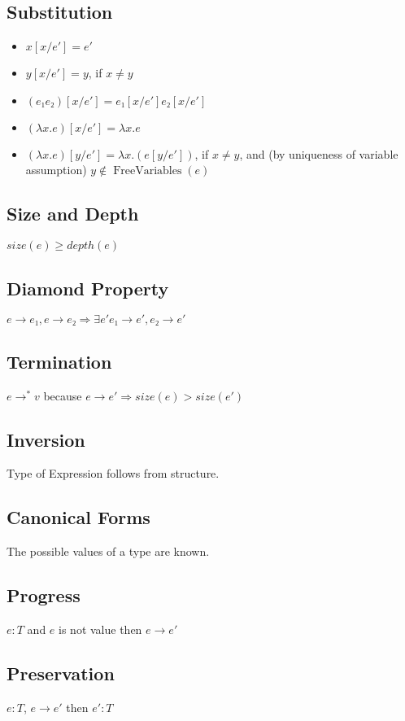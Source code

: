 \documentclass[10pt,a4paper]{article}
\newcommand{\on}{\operatorname}
\begin{document}
\subsection{Substitution}

\begin{itemize}
\item $x[x/e'] = e'$
\item $y[x/e'] = y$, if $x ≠ y$
\item $(e₁ e₂)[x/e'] = e₁[x/e'] e₂[x/e']$
\item $(λx.e)[x/e'] = λx.e$
\item $(λx.e)[y/e'] = λx.(e[y/e'])$, if $x ≠ y$, and (by uniqueness of variable assumption) $y ∉ \on{FreeVariables}(e)$
\end{itemize}


\subsection{Size and Depth}
$size(e) \ge depth(e)$

\subsection{Diamond Property}
$e → e₁, e → e₂ ⇒ ∃e' e₁ → e', e₂ → e'$

\subsection{Termination}
$e →^* v$ because $e → e' ⇒ size(e) > size(e')$

\subsection{Inversion}
Type of Expression follows from structure.

\subsection{Canonical Forms}
The possible values of a type are known.

\subsection{Progress}
$e:T$ and $e$ is not value then $e → e'$

\subsection{Preservation}
$e:T$, $e→e'$ then $e':T$
\end{document}
